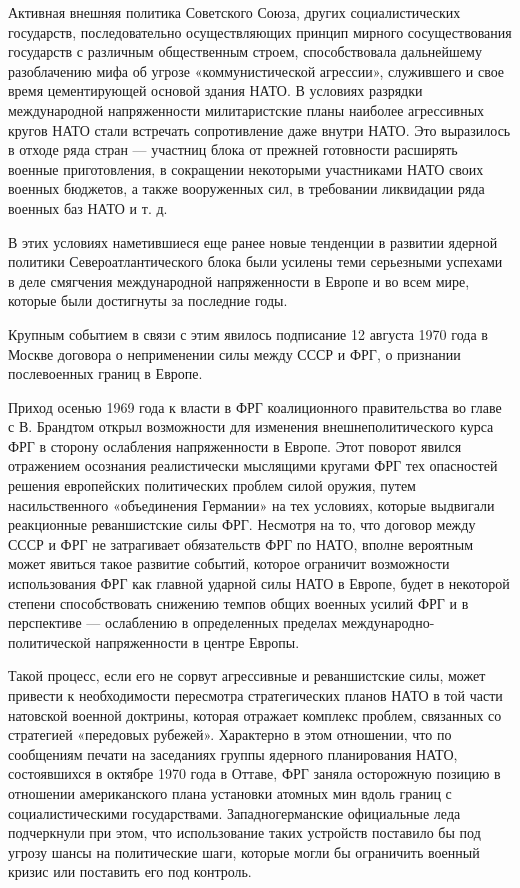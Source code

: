 \documentclass[12pt, a4paper, openany]{book}
\begin{document}
	Активная внешняя политика Советского Союза, других социалистических государств, последовательно осуществляющих принцип мирного сосуществования государств с различным общественным строем, способствовала дальнейшему разоблачению мифа об угрозе «коммунистической агрессии», служившего и свое время цементирующей основой здания НАТО. В условиях разрядки международной напряженности милитаристские планы наиболее агрессивных кругов НАТО стали встречать сопротивление даже внутри НАТО. Это выразилось в отходе ряда стран — участниц блока от прежней готовности расширять военные приготовления, в сокращении некоторыми участниками НАТО своих военных бюджетов, а также вооруженных сил, в требовании ликвидации ряда военных баз НАТО и т. д.
	
	В этих условиях наметившиеся еще ранее новые тенденции в развитии ядерной политики Североатлантического блока были усилены теми серьезными успехами в деле смягчения международной напряженности в Европе и во всем мире, которые были достигнуты за последние годы.
	
	Крупным событием в связи с этим явилось подписание 12 августа 1970 года в Москве договора о неприменении силы между СССР и ФРГ, о признании послевоенных границ в Европе.
	
	Приход осенью 1969 года к власти в ФРГ коалиционного правительства во главе с В. Брандтом открыл возможности для изменения внешнеполитического курса ФРГ в сторону ослабления напряженности в Европе. Этот поворот явился отражением осознания реалистически мыслящими кругами ФРГ тех опасностей решения европейских политических проблем силой оружия, путем насильственного «объединения Германии» на тех условиях, которые выдвигали реакционные реваншистские силы ФРГ. Несмотря на то, что договор между СССР и ФРГ не затрагивает обязательств ФРГ по НАТО, вполне вероятным может явиться такое развитие событий, которое ограничит возможности использования ФРГ как главной ударной силы НАТО в Европе, будет в некоторой степени способствовать снижению темпов общих военных усилий ФРГ и в перспективе — ослаблению в определенных пределах международно-политической напряженности в центре Европы.
	
	Такой процесс, если его не сорвут агрессивные и реваншистские силы, может привести к необходимости пересмотра стратегических планов НАТО в той части натовской военной доктрины, которая отражает комплекс проблем, связанных со стратегией «передовых рубежей». Характерно в этом отношении, что по сообщениям печати на заседаниях группы ядерного планирования НАТО, состоявшихся в октябре 1970 года в Оттаве, ФРГ заняла осторожную позицию в отношении американского плана установки атомных мин вдоль границ с социалистическими государствами. Западногерманские официальные леда подчеркнули при этом, что использование таких устройств поставило бы под угрозу шансы на политические шаги, которые могли бы ограничить военный кризис или поставить его под контроль.
	
\end{document}

